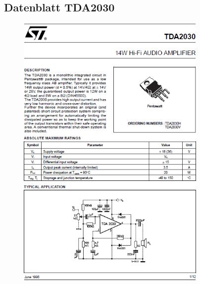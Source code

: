 \subsection{Datenblatt TDA2030}\label{subsec:8.3.5}
\begin{figure} [H]	
	\centering
	\includegraphics[width=0.82\textwidth]{form/tda2030first.PNG}
\end{figure}

